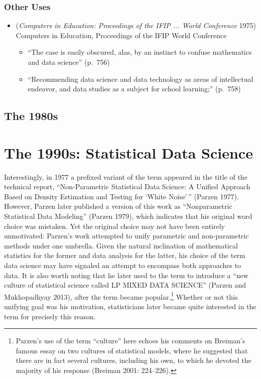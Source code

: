 \documentclass[
  letterpaper,
]{report}
\begin{document}
\hypertarget{other-uses}{%
\subsection{Other Uses}\label{other-uses}}

\begin{itemize}
\item
  (\emph{Computers in Education: Proceedings of the IFIP ... World
  Conference} 1975) Computers in Education, Proceedings of the IFIP
  World Conference

  \begin{itemize}
  \item
    ``The case is easily obscured, alas, by an instinct to confuse
    mathematics and data science'' (p.~756)
  \item
    ``Recommending data science and data technology as areas of
    intellectual endeavor, and data studies as a subject for school
    learning;'' (p.~758)
  \end{itemize}
\end{itemize}

\hypertarget{the-1980s}{%
\section{The 1980s}\label{the-1980s}}

\hypertarget{the-1990s-statistical-data-science}{%
\chapter{The 1990s: Statistical Data
Science}\label{the-1990s-statistical-data-science}}

Interestingly, in 1977 a prefixed variant of the term appeared in the
title of the technical report, ``Non-Parametric Statistical Data
Science: A Unified Approach Based on Density Estimation and Testing for
`White Noise'\,'' (Parzen 1977). However, Parzen later published a
version of this work as ``Nonparametric Statistical Data Modeling''
(Parzen 1979), which indicates that his original word choice was
mistaken. Yet the original choice may not have been entirely
unmotivated: Parzen's work attempted to unify parametric and
non-parametric methods under one umbrella. Given the natural inclination
of mathematical statistics for the former and data analysis for the
latter, his choice of the term data science may have signaled an attempt
to encompass both approaches to data. It is also worth noting that he
later used to the term to introduce a ``new culture of statistical
science called LP MIXED DATA SCIENCE'' (Parzen and Mukhopadhyay 2013),
after the term became popular.\footnote{Parzen's use of the term
  ``culture'' here echoes his comments on Breiman's famous essay on two
  cultures of statistical models, where he suggested that there are in
  fact several cultures, including his own, to which he devoted the
  majority of his response (Breiman 2001: 224--226).} Whether or not
this unifying goal was his motivation, statisticians later became quite
interested in the term for precisely this reason.
\end{document}
